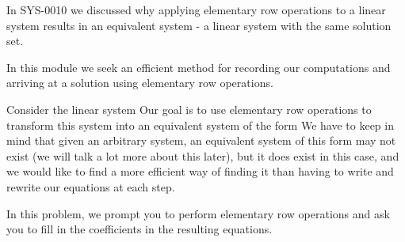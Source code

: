 \documentclass{ximera}
\begin{document}
In SYS-0010 we discussed why applying elementary row operations to a linear system results in an equivalent system - a linear system with the same solution set.

In this module we seek an efficient method for recording our computations and arriving at a solution using elementary row operations. 

\begin{exploration}\label{init:augmentedmatrixex}
Consider the linear system
Our goal is to use elementary row operations to transform this system into an equivalent system of the form
 We have to keep in mind that given an arbitrary system, an equivalent system of this form may not exist (we will talk a lot more about this later), but it does exist in this case, and we would like to find a more efficient way of finding it than having to write and rewrite our equations at each step.   
 
In this problem, we prompt you to perform elementary row operations and ask you to fill in the coefficients in the resulting equations.
 
    

\end{exploration}
\end{document}
